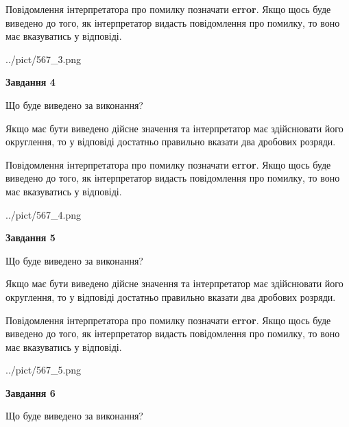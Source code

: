 \documentclass[12pt, ukrainian]{article}
\begin{document}
{\begin {Large}
Повідомлення інтерпретатора про помилку позначати \textbf{error}.
Якщо щось буде виведено до того, як інтерпретатор видасть повідомлення про помилку, 
то воно має вказуватись у відповіді. \par

\begin{center}
	{../pict/567_3.png}
\end{center}
\newpage

{\begin {center}\textbf{Завдання 4}\end {center}}\par
Що буде виведено за виконання? \par

Якщо має бути виведено дійсне значення та інтерпретатор має здійснювати його округлення, 
то у відповіді достатньо правильно вказати два дробових розряди.

Повідомлення інтерпретатора про помилку позначати \textbf{error}.
Якщо щось буде виведено до того, як інтерпретатор видасть повідомлення про помилку, 
то воно має вказуватись у відповіді. \par

\begin{center}
	{../pict/567_4.png}
\end{center}
\newpage

{\begin {center}\textbf{Завдання 5}\end {center}}\par
Що буде виведено за виконання? \par

Якщо має бути виведено дійсне значення та інтерпретатор має здійснювати його округлення, 
то у відповіді достатньо правильно вказати два дробових розряди.

Повідомлення інтерпретатора про помилку позначати \textbf{error}.
Якщо щось буде виведено до того, як інтерпретатор видасть повідомлення про помилку, 
то воно має вказуватись у відповіді. \par

\begin{center}
	{../pict/567_5.png}
\end{center}
\newpage

{\begin {center}\textbf{Завдання 6}\end {center}}\par
Що буде виведено за виконання? \par


\end{Large}}
\end{document}
